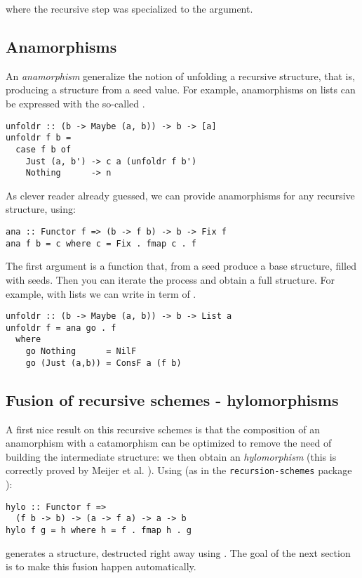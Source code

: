 \noindent
where the recursive step was specialized to the  argument.

\subsection{Anamorphisms}
An \emph{anamorphism} generalize the notion of unfolding a recursive structure, that is, producing a structure from a seed value.
For example, anamorphisms on lists can be expressed with the so-called .
\begin{verbatim}
unfoldr :: (b -> Maybe (a, b)) -> b -> [a]
unfoldr f b =
  case f b of
    Just (a, b') -> c a (unfoldr f b')
    Nothing      -> n
\end{verbatim}

\noindent As clever reader already guessed, we can provide anamorphisms for any recursive structure, using:
\begin{verbatim}
ana :: Functor f => (b -> f b) -> b -> Fix f
ana f b = c where c = Fix . fmap c . f
\end{verbatim}
The first argument is a function that, from a seed produce a base structure, filled with seeds. Then you can iterate the process and obtain a full structure. For example, with lists we can write  in term of .
\begin{verbatim}
unfoldr :: (b -> Maybe (a, b)) -> b -> List a
unfoldr f = ana go . f
  where
    go Nothing      = NilF
    go (Just (a,b)) = ConsF a (f b)
\end{verbatim}

\subsection{Fusion of recursive schemes - hylomorphisms}
A first nice result on this recursive schemes is that the composition of an anamorphism with a catamorphism can be optimized to remove the need of building the intermediate structure: we then obtain an \emph{hylomorphism} (this is correctly proved by Meijer et al. \cite{4cec4a43c86444479dc0003182424795}).
Using (as in the \verb|recursion-schemes| package \cite{ekmett:eschems}):
\begin{verbatim}
hylo :: Functor f =>
  (f b -> b) -> (a -> f a) -> a -> b
hylo f g = h where h = f . fmap h . g
\end{verbatim}
\noindent {} generates a structure, destructed right away using .
The goal of the next section is to make this fusion happen automatically.